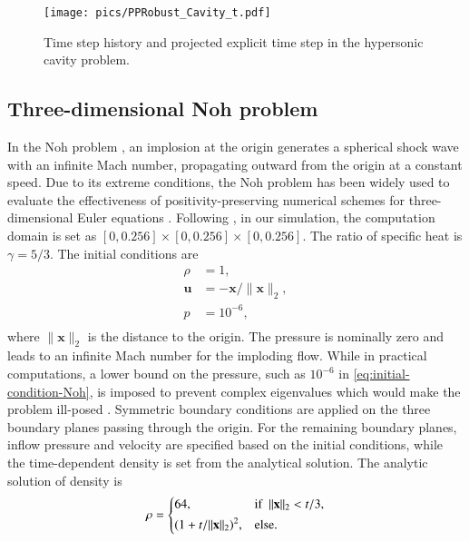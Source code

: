 \begin{figure}[htbp!]
    \centering
    \texttt{[image: pics/PPRobust\_Cavity\_t.pdf]}
    \caption{Time step history and projected explicit time step in the 
    hypersonic cavity problem.}
    \label{fig:Cavity_time}
\end{figure}

\subsection{Three-dimensional Noh problem}

In the Noh problem \cite{noh1987errors}, an implosion at the origin generates a spherical shock wave with an infinite Mach number, propagating outward from the origin at a constant speed. 
Due to its extreme conditions, the Noh problem has been widely used to evaluate the effectiveness of positivity-preserving numerical schemes for three-dimensional Euler equations \cite{hu2013positivity}.
Following \cite{johnsen2010assessment}, 
in our simulation, the computation domain is set as
$[0,0.256]\times[0,0.256]\times[0,0.256]$. The ratio of specific heat is $\gamma=5/3$.
The initial conditions are
\begin{equation}
\label{eq:initial-condition-Noh}
    \begin{aligned}
        \rho & = 1, \\
        \mathbf{u}  &= -\mathbf{x} /\|\mathbf{x}\|_2, \\
        p & = 10^{-6},\\
    \end{aligned}
\end{equation}
where $\|\mathbf{x}\|_2$ is the distance to the 
origin. The pressure is nominally zero and leads to an infinite Mach number for the imploding flow. While in practical computations, a lower bound on the pressure, such as $10^{-6}$ in \eqref{eq:initial-condition-Noh}, is imposed to prevent complex eigenvalues which would make the problem ill-posed \cite{johnsen2010assessment}.
Symmetric boundary conditions are applied on the three boundary planes passing through the origin. For the remaining boundary planes, inflow pressure and velocity are specified based on the initial conditions, while the time-dependent density is set from the analytical solution.
The analytic solution of density \cite{noh1987errors} is 
\begin{equation}
    \rho = 
    \begin{dcases}
        64, & \text{if } \ \|\mathbf{x}\|_2<t/3, \\
        (1+t/\|\mathbf{x}\|_2)^2,  & \text{else}.
    \end{dcases}
\end{equation}
